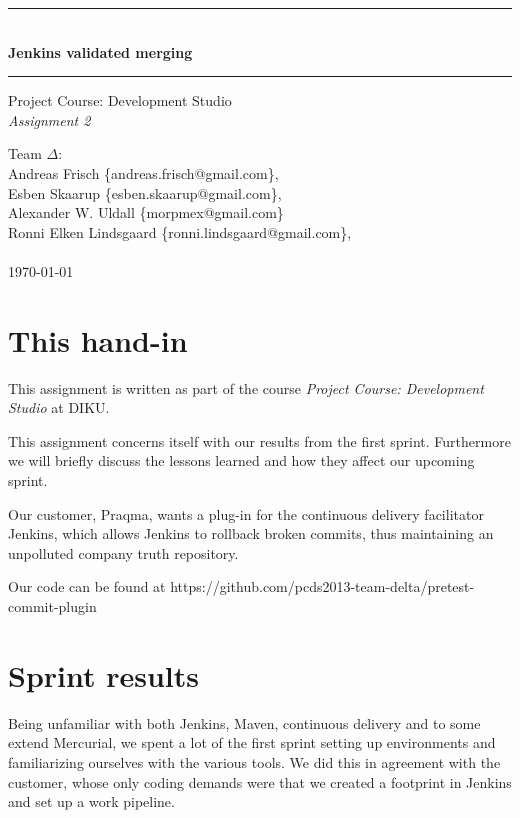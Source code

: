 \documentclass[a4paper]{article}
\makeatletter
\newcommand{\systemname}{Jenkins validated merging}
\newcommand{\groupname}{Team $\Delta$}
\newcommand{\groupmembers}{
	Andreas Frisch \{andreas.frisch@gmail.com\}, \\
	Esben Skaarup \{esben.skaarup@gmail.com\}, \\
	Alexander W. Uldall \{morpmex@gmail.com\} \\
	Ronni Elken Lindsgaard \{ronni.lindsgaard@gmail.com\}, \\
	~
}
\makeatother
\begin{document}
\begin{titlepage}
	\begin{center}
		\vspace*{4cm}
		\rule{\linewidth}{0.5mm}\\[0.4cm]
		{\huge \bfseries \systemname}
		\rule{\linewidth}{0.5mm}
	\end{center}
	\begin{flushleft}
		{
			\Large Project Course: Development Studio \\[0.1cm]
			{\it Assignment 2}
		}
	\end{flushleft}
	\vspace*{4cm}
	
	\begin{flushleft}
		{\Large \groupname :} \\[0.1cm]
		{\Large \groupmembers} \\[0.3cm]
		{\Large \today}
	\end{flushleft}
\end{titlepage}
\newpage
\onehalfspacing
\setcounter{tocdepth}{2}

\section{This hand-in}
This assignment is written as part of the course {\it Project Course: Development Studio} at DIKU.

This assignment concerns itself with our results from the first sprint.
Furthermore we will briefly discuss the lessons learned and how they affect our
upcoming sprint.

Our customer, Praqma, wants a plug-in for the continuous delivery facilitator
Jenkins, which allows Jenkins to rollback broken commits, thus maintaining an
unpolluted company truth repository.

Our code can be found at https://github.com/pcds2013-team-delta/pretest-commit-plugin

\section{Sprint results}
Being unfamiliar with both Jenkins, Maven, continuous delivery and to some extend
Mercurial, we spent a lot of the first sprint setting up environments and
familiarizing ourselves with the various tools. We did this in agreement with
the customer, whose only coding demands were that we created a footprint in
Jenkins and set up a work pipeline.
\end{document}
